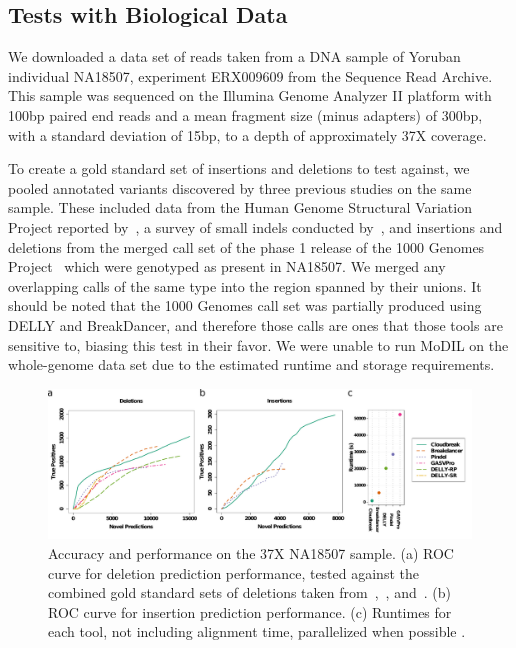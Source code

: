 \documentclass [11pt] {report}
\newcommand{\todo}[1]{}
\begin{document}
\subsection{Tests with Biological Data}

We downloaded a data set of reads taken from a DNA sample of Yoruban individual NA18507, experiment ERX009609 from the Sequence Read Archive. This sample was sequenced on the Illumina Genome Analyzer II platform with 100bp paired end reads and a mean fragment size (minus adapters) of 300bp, with a standard deviation of 15bp, to a depth of approximately 37X coverage.

To create a gold standard set of insertions and deletions to test against, we pooled annotated variants discovered by three previous studies on the same sample. These included data from the Human Genome Structural Variation Project reported by~\cite{Kidd:2008p926}, a survey of small indels conducted by~\cite{Mills:2011fi}, and insertions and deletions from the merged call set of the phase 1 release of the 1000 Genomes Project~\cite{GenomesProjectConsortium:2012co} which were genotyped as present in NA18507. We merged any overlapping calls of the same type into the region spanned by their unions. It should be noted that the 1000 Genomes call set was partially produced using DELLY and BreakDancer, and therefore those calls are ones that those tools are sensitive to, biasing this test in their favor. We were unable to run MoDIL on the whole-genome data set due to the estimated runtime and storage requirements.

\begin{figure}
\centering
\includegraphics[width=1\textwidth]{figures/NA18507_rocs_runtime.pdf}
\caption{Accuracy and performance on the 37X NA18507 sample. (a) ROC curve for deletion prediction performance, tested against the combined gold standard sets of deletions taken from~\cite{Kidd:2008p926},~\cite{Mills:2011fi}, and~\cite{GenomesProjectConsortium:2012co}. (b) ROC curve for insertion prediction performance. (c) Runtimes for each tool, not including alignment time, parallelized when possible \todo{(see Supplementary Material)}. }
\label{NA18507CombinedRoc}
\end{figure}
\end{document}

